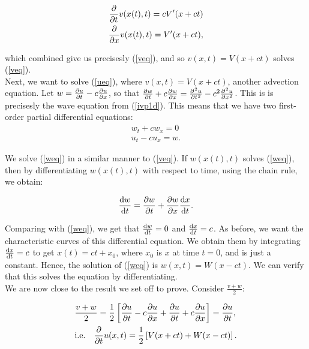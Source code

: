 \documentclass[a4paper, 12pt]{article}
\numberwithin{equation}{section}
\begin{document}
\begin{equation*} 
    \begin{aligned}
    \diffp[1]{}{t}v(x(t), t)=cV'(x+ct)\\
    \diffp[1]{}{x}v(x(t), t)=V'(x+ct),
    \end{aligned}
\end{equation*}

which combined give us precisesly (\ref{veq}), and so $v(x,t)=V(x+ct)$ solves
(\ref{veq}). \\

Next, we want to solve (\ref{ueq}), where $v(x,t)=V(x+ct)$, another advection
equation. Let $w=\diffp[1]{u}{t}-c\diffp{u}{x}$, so that
$\diffp[1]{w}{t}+c\diffp{w}{x}=\diffp[2]{u}{t}-c^2\diffp[2]{u}{x}$. This is is
precisesly the wave equation from (\ref{ivp1d}). This means that we have two
first-order partial differential equations:
\begin{align}
    \label{weq}
    w_t+cw_x=0\\
    \label{ueqw}
    u_t-cu_x=w.
\end{align}

We solve (\ref{weq}) in a similar manner to (\ref{veq}). If $w(x(t), t)$ solves
(\ref{weq}), then by differentiating $w(x(t),t)$ with respect to time, using the
chain rule, we obtain:

\begin{equation} \label{diffw}
    \diff{w}{t}=\diffp[1]{w}{t}+\diffp[1]{w}{x}\diff{x}{t}. 
\end{equation}

Comparing with (\ref{weq}), we get that $\diff{w}{t}=0$ and $\diff{x}{t}=c$. As
before, we want the characteristic curves of this differential equation. We
obtain them by integrating $\diff{x}{t}=c$ to get $x(t)=ct+x_0$, where $x_0$ is
$x$ at time $t=0$, and is just a constant. Hence, the solution of (\ref{weq}) is
$w(x,t)=W(x-ct)$. We can verify that this solves the equation by
differentiating. \\

We are now close to the result we set off to prove. Consider $\frac{v+w}{2}$:

\begin{equation*}
    \begin{aligned}
    &\frac{v+w}{2}=\frac{1}{2}\left[\diffp[1]{u}{t}-c\diffp[1]{u}{x}+\diffp[1]{u}{t}+c\diffp[1]{u}{x}\right]=\diffp[1]{u}{t},\\
    &\textrm{i.e.} \quad \diffp[1]{}{t}u(x, t)=\frac{1}{2}\left[V(x+ct)+W(x-ct)\right].
    \end{aligned}
\end{equation*}
\end{document}
